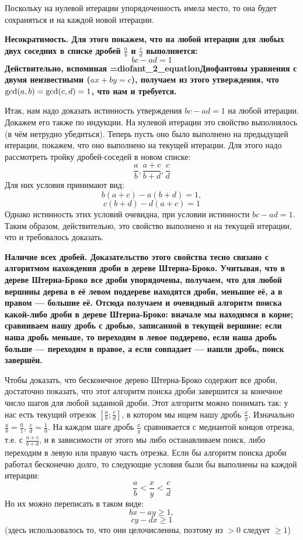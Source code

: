 Поскольку на нулевой итерации упорядоченность имела место, то она будет сохраняться и на каждой новой итерации.

\bf{Несократимость}. Для этого покажем, что на любой итерации для любых двух соседних в списке дробей $\frac{a}{b}$ и $\frac{c}{d}$ выполняется:
$$ bc-ad=1 $$
Действительно, вспоминая \algohref=diofant_2_equation{Диофантовы уравнения с двумя неизвестными ($ax+by=c$)}, получаем из этого утверждения, что ${\rm gcd}(a,b) = {\rm gcd}(c,d) = 1$, что нам и требуется.

Итак, нам надо доказать истинность утверждения $bc-ad=1$ на любой итерации. Докажем его также по индукции. На нулевой итерации это свойство выполнялось (в чём нетрудно убедиться). Теперь пусть оно было выполнено на предыдущей итерации, покажем, что оно выполнено на текущей итерации. Для этого надо рассмотреть тройку дробей-соседей в новом списке:
$$ \frac{a}{b}, \frac{a+c}{b+d}, \frac{c}{d} $$
Для них условия принимают вид:
$$ b(a+c) - a(b+d) = 1, $$
$$ c(b+d) - d(a+c) = 1 $$
Однако истинность этих условий очевидна, при условии истинности $bc-ad=1$. Таким образом, действительно, это свойство выполнено и на текущей итерации, что и требовалось доказать.

\bf{Наличие всех дробей}. Доказательство этого свойства тесно связано с алгоритмом нахождения дроби в дереве Штерна-Броко. Учитывая, что в дереве Штерна-Броко все дроби упорядочены, получаем, что для любой вершины дерева в её левом поддереве находятся дроби, меньшие её, а в правом --- большие её. Отсюда получаем и очевидный алгоритм поиска какой-либо дроби в дереве Штерна-Броко: вначале мы находимся в корне; сравниваем нашу дробь с дробью, записанной в текущей вершине: если наша дробь меньше, то переходим в левое поддерево, если наша дробь больше --- переходим в правое, а если совпадает --- нашли дробь, поиск завершён.

Чтобы доказать, что бесконечное дерево Штерна-Броко содержит все дроби, достаточно показать, что этот алгоритм поиска дроби завершится за конечное число шагов для любой заданной дроби. Этот алгоритм можно понимать так: у нас есть текущий отрезок $\left[ \frac{a}{b}; \frac{c}{d} \right]$, в котором мы ищем нашу дробь $\frac{x}{y}$. Изначально $\frac{a}{b}=\frac{0}{1}$, $\frac{c}{d}=\frac{1}{0}$. На каждом шаге дробь $\frac{x}{y}$ сравнивается с медиантой концов отрезка, т.е. с $\frac{a+c}{b+d}$, и в зависимости от этого мы либо останавливаем поиск, либо переходим в левую или правую часть отрезка. Если бы алгоритм поиска дроби работал бесконечно долго, то следующие условия были бы выполнены на каждой итерации:
$$ \frac{a}{b} < \frac{x}{y} < \frac{c}{d} $$
Но их можно переписать в таком виде:
$$ bx-ay \ge 1, $$
$$ cy-dx \ge 1 $$
(здесь использовалось то, что они целочисленны, поэтому из $>0$ следует $\ge 1$)

